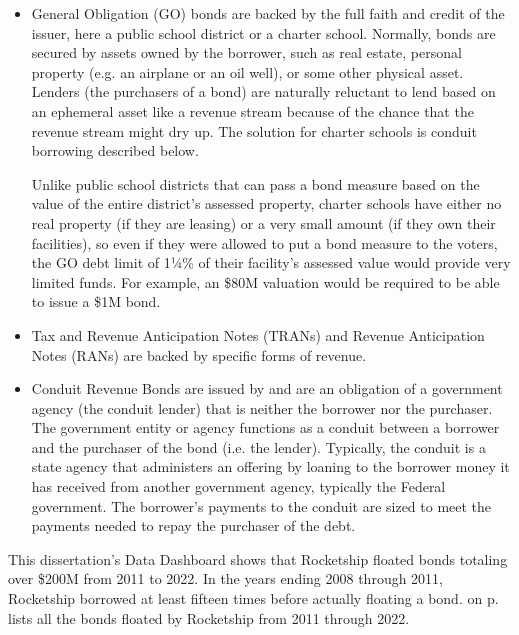 \begin{itemize}
  \item General Obligation (GO) bonds are backed by the full faith and credit of the issuer, here a public school district or a charter school. Normally, bonds are secured by assets owned by the borrower, such as real estate, personal property (e.g. an airplane or an oil well), or some other physical asset. Lenders (the purchasers of a bond) are naturally reluctant to lend based on an ephemeral asset like a revenue stream because of the chance that the revenue stream might dry up. The solution for charter schools is conduit borrowing described below.

  Unlike public school districts that can pass a bond measure based on the value of the entire district's assessed property, charter schools have either no real property (if they are leasing) or a very small amount (if they own their facilities), so even if they were allowed to put a bond measure to the voters, the GO debt limit of 1¼\% of their facility's assessed value would provide very limited funds. For example, an \$80M valuation would be required to be able to issue a \$1M bond. 

  \item Tax and Revenue Anticipation Notes (TRANs) and Revenue Anticipation Notes (RANs) are backed by specific forms of revenue.
  
  \item Conduit Revenue Bonds are issued by and are an obligation of a government agency (the conduit lender) that is neither the borrower nor the purchaser. The government entity or agency functions as a conduit between a borrower and the purchaser of the bond (i.e. the lender). Typically, the conduit is a state agency that administers an offering by loaning to the borrower money it has received from another government agency, typically the Federal government. The borrower's payments to the conduit are sized to meet the payments needed to repay the purchaser of the debt.
\end{itemize}

This dissertation's Data Dashboard shows that Rocketship floated bonds totaling over \$200M from 2011 to 2022. In the years ending 2008 through 2011, Rocketship borrowed at least fifteen times before actually floating a bond.  on p.\pageref{tab:rocketship_bonds} lists all the bonds floated by Rocketship from 2011 through 2022.

